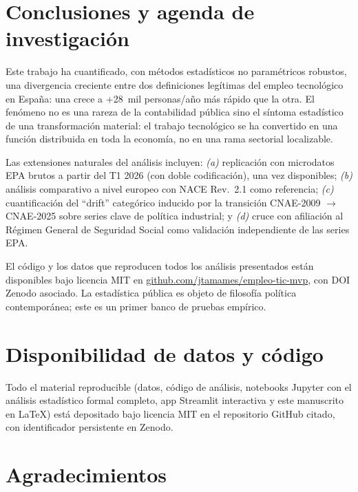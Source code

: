 \documentclass[11pt,a4paper]{article}
\begin{document}
\section{Conclusiones y agenda de investigación}

Este trabajo ha cuantificado, con métodos estadísticos no paramétricos
robustos, una divergencia creciente entre dos definiciones legítimas del
empleo tecnológico en España: una crece a +28~mil personas/año más rápido que
la otra. El fenómeno no es una rareza de la contabilidad pública sino el
síntoma estadístico de una transformación material: el trabajo tecnológico se
ha convertido en una función distribuida en toda la economía, no en una rama
sectorial localizable.

Las extensiones naturales del análisis incluyen: \emph{(a)} replicación con
microdatos EPA brutos a partir del T1 2026 (con doble codificación), una vez
disponibles; \emph{(b)} análisis comparativo a nivel europeo con NACE Rev.~2.1
como referencia; \emph{(c)} cuantificación del ``drift'' categórico inducido
por la transición CNAE-2009 $\rightarrow$ CNAE-2025 sobre series clave de
política industrial; y \emph{(d)} cruce con afiliación al Régimen General de
Seguridad Social como validación independiente de las series EPA.

El código y los datos que reproducen todos los análisis presentados están
disponibles bajo licencia MIT en
\href{https://github.com/jtamames/empleo-tic-mvp}{github.com/jtamames/empleo-tic-mvp},
con DOI Zenodo asociado. La estadística pública es objeto de filosofía
política contemporánea; este es un primer banco de pruebas empírico.

\section*{Disponibilidad de datos y código}

Todo el material reproducible (datos, código de análisis, notebooks Jupyter
con el análisis estadístico formal completo, app Streamlit interactiva y este
manuscrito en LaTeX) está depositado bajo licencia MIT en el repositorio
GitHub citado, con identificador persistente en Zenodo.

\section*{Agradecimientos}
\end{document}
